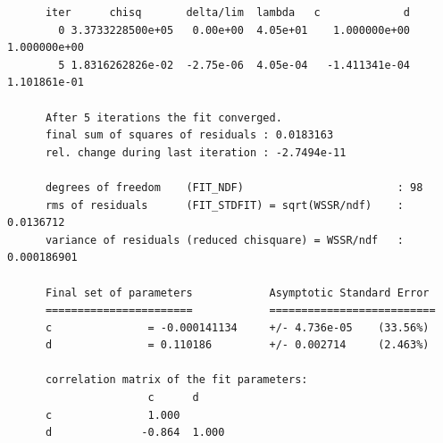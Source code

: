 \documentclass{article}
\begin{document}
\begin{verbatim}
      iter      chisq       delta/lim  lambda   c             d            
        0 3.3733228500e+05   0.00e+00  4.05e+01    1.000000e+00   1.000000e+00
        5 1.8316262826e-02  -2.75e-06  4.05e-04   -1.411341e-04   1.101861e-01
      
      After 5 iterations the fit converged.
      final sum of squares of residuals : 0.0183163
      rel. change during last iteration : -2.7494e-11
      
      degrees of freedom    (FIT_NDF)                        : 98
      rms of residuals      (FIT_STDFIT) = sqrt(WSSR/ndf)    : 0.0136712
      variance of residuals (reduced chisquare) = WSSR/ndf   : 0.000186901
      
      Final set of parameters            Asymptotic Standard Error
      =======================            ==========================
      c               = -0.000141134     +/- 4.736e-05    (33.56%)
      d               = 0.110186         +/- 0.002714     (2.463%)
      
      correlation matrix of the fit parameters:
                      c      d      
      c               1.000 
      d              -0.864  1.000   
\end{verbatim}
\end{document}
